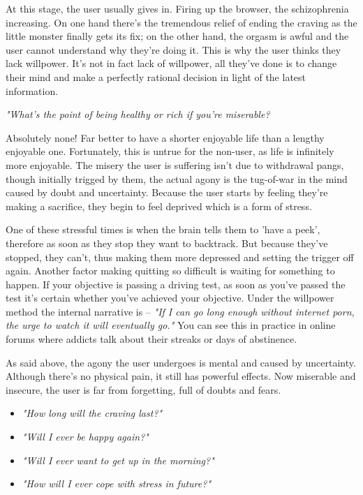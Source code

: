 \documentclass[easypeasy.tex]{subfiles}
\begin{document}
At this stage, the user usually gives in. Firing up the browser, the schizophrenia increasing. On one hand there's the tremendous relief of ending the craving as the little monster finally gets its fix; on the other hand, the orgasm is awful and the user cannot understand why they're doing it. This is why the user thinks they lack willpower. It's not in fact lack of willpower, all they've done is to change their mind and make a perfectly rational decision in light of the latest information.

  \textit{"What's the point of being healthy or rich if you're miserable?}

Absolutely none! Far better to have a shorter enjoyable life than a lengthy enjoyable one. Fortunately, this is untrue for the non-user, as life is infinitely more enjoyable. The misery the user is suffering isn't due to withdrawal pangs, though initially trigged by them, the actual agony is the tug-of-war in the mind caused by doubt and uncertainty. Because the user starts by feeling they're making a sacrifice, they begin to feel deprived which is a form of stress.

One of these stressful times is when the brain tells them to 'have a peek', therefore as soon as they stop they want to backtrack. But because they've stopped, they can't, thus making them more depressed and setting the trigger off again. Another factor making quitting so difficult is waiting for something to happen. If your objective is passing a driving test, as soon as you've passed the test it's certain whether you've achieved your objective. Under the willpower method the internal narrative is -- \textit{"If I can go long enough without internet porn, the urge to watch it will eventually go."} You can see this in practice in online forums where addicts talk about their streaks or days of abstinence.

As said above, the agony the user undergoes is mental and caused by uncertainty. Although there's no physical pain, it still has powerful effects. Now miserable and insecure, the user is far from forgetting, full of doubts and fears.

\begin{itemize}
  \item \textit{"How long will the craving last?"}
  \item \textit{"Will I ever be happy again?"}
  \item \textit{"Will I ever want to get up in the morning?"}
  \item \textit{"How will I ever cope with stress in future?"}
\end{itemize}
\end{document}
